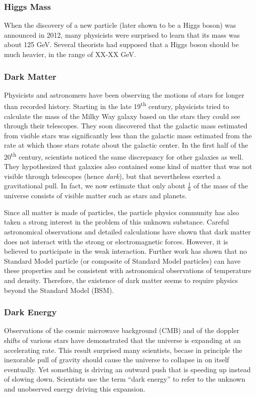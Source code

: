 \subsubsection*{Higgs Mass}
When the discovery of a new particle (later shown to be a Higgs boson)
was announced in 2012, many physicists were surprised to learn that %
its mass was about 125 GeV. Several theorists had supposed that a
Higgs boson should be much heavier, in the range of XX-XX GeV. %

\subsubsection*{Dark Matter}
Physicists and astronomers have been observing the motions of stars
for longer than recorded history. Starting in the late 19\textsuperscript{th}
century, physicists tried to calculate the mass of the Milky Way
galaxy based on the stars they could see through their
telescopes. They soon discovered that the galactic mass estimated from
visible stars was significantly less than the galactic mass
estimated from the rate at which those stars rotate about the
galactic center. In the first half of the 20\textsuperscript{th}
century, scientists noticed the same discrepancy for other galaxies
as well. They hypothesized that galaxies also contained some kind of
matter that was not visible through telescopes (hence \emph{dark}),
but that nevertheless exerted a gravitational pull. In fact, we now
estimate that only about $\frac{1}{6}$ of the mass of the universe consists
of visible matter such as stars and planets. %

Since all matter is made of particles, the particle physics community
has also taken a strong interest in the problem of this unknown
substance. Careful astronomical observations and detailed calculations
have shown that dark matter does not interact with the strong or
electromagnetic forces. %
However, it is believed to participate in the weak interaction. %
Further work has shown that no Standard Model particle (or composite
of Standard Model particles) can have these properties and be
consistent with astronomical observations of temperature and %
density. Therefore, the existence of dark matter seems to require
physics beyond the Standard Model (BSM).

\subsubsection*{Dark Energy}
Observations of the cosmic microwave background (CMB) and of the %
doppler shifts of various stars have demonstrated that the universe is
expanding at an accelerating rate. This result surprised many
scientists, becase in principle the inexorable pull of gravity should
cause the universe to collapse in on itself eventually. Yet something
is driving an outward push that is speeding up instead of slowing
down. Scientists use the term ``dark energy'' to refer to the unknown
and unobserved energy driving this expansion.

